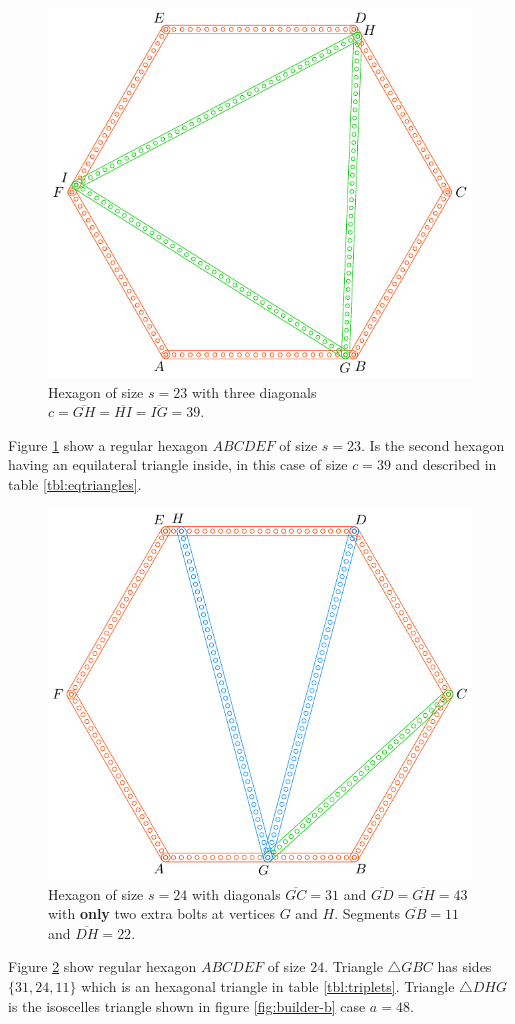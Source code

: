 \documentclass[11pt]{article}
\begin{document}
\begin{figure}[H]
\centering
\includegraphics[scale=0.9]{23/hexa-23a}
\caption{Hexagon of size $s = 23$ with three diagonals $c = \overline{GH} = \overline{HI} = \overline{IG} = 39$.}
\label{fig:23a}
\end{figure}

Figure \ref{fig:23a} show a regular hexagon $ABCDEF$ of size $s=23$. Is the second hexagon having an equilateral triangle inside, in this case of size $c=39$ and described in table \ref{tbl:eqtriangles}.

\begin{figure}[H]
\centering
\includegraphics[scale=0.9]{24/hexa-24a}
\caption{Hexagon of size $s = 24$ with diagonals $\overline{GC} = 31$ and $\overline{GD} = \overline{GH} = 43$ with \textbf{only} two extra bolts at vertices $G$ and $H$. Segments $\overline{GB} = 11$ and $\overline{DH} = 22$.}
\label{fig:24a}
\end{figure}

Figure \ref{fig:24a} show regular hexagon $ABCDEF$ of size $24$. Triangle $\triangle{GBC}$ has sides $\{31,24,11\}$ which is an hexagonal triangle in table \ref{tbl:triplets}. Triangle $\triangle{DHG}$ is the isoscelles triangle shown in figure \ref{fig:builder-b} case $a=48$.
\end{document}
